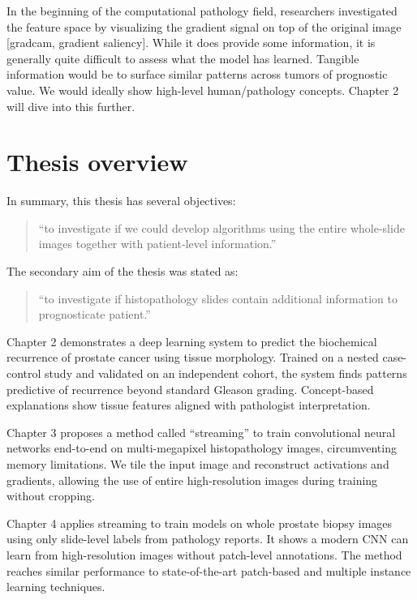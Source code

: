 \documentclass[
  12pt,
  a5,margin=2cmpaper,
]{article}
\begin{document}
In the beginning of the computational pathology field, researchers
investigated the feature space by visualizing the gradient signal on top
of the original image {[}gradcam, gradient saliency{]}. While it does
provide some information, it is generally quite difficult to assess what
the model has learned. Tangible information would be to surface similar
patterns across tumors of prognostic value. We would ideally show
high-level human/pathology concepts. Chapter 2 will dive into this
further.

\hypertarget{thesis-overview}{%
\section{Thesis overview}\label{thesis-overview}}

In summary, this thesis has several objectives:

\begin{quote}
``to investigate if we could develop algorithms using the entire
whole-slide images together with patient-level information.''
\end{quote}

The secondary aim of the thesis was stated as:

\begin{quote}
``to investigate if histopathology slides contain additional information
to prognosticate patient.''
\end{quote}

Chapter 2 demonstrates a deep learning system to predict the biochemical
recurrence of prostate cancer using tissue morphology. Trained on a
nested case-control study and validated on an independent cohort, the
system finds patterns predictive of recurrence beyond standard Gleason
grading. Concept-based explanations show tissue features aligned with
pathologist interpretation.

Chapter 3 proposes a method called ``streaming'' to train convolutional
neural networks end-to-end on multi-megapixel histopathology images,
circumventing memory limitations. We tile the input image and
reconstruct activations and gradients, allowing the use of entire
high-resolution images during training without cropping.

Chapter 4 applies streaming to train models on whole prostate biopsy
images using only slide-level labels from pathology reports. It shows a
modern CNN can learn from high-resolution images without patch-level
annotations. The method reaches similar performance to state-of-the-art
patch-based and multiple instance learning techniques.
\end{document}
